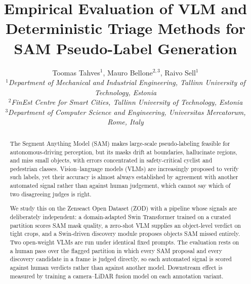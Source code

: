 \documentclass[conference]{IEEEtran}
\title{Empirical Evaluation of VLM and Deterministic Triage Methods for SAM Pseudo-Label Generation}
\author{\small Toomas Tahves$^{1}$, Mauro Bellone$^{2,3}$, Raivo Sell$^{1}$ \\
$^{1}$\textit{Department of Mechanical and Industrial Engineering, Tallinn University of Technology, Estonia} \\
$^{2}$\textit{FinEst Centre for Smart Cities, Tallinn University of Technology, Estonia} \\
$^{3}$\textit{Department of Computer Science and Engineering, Universitas Mercatorum, Rome, Italy} \\
}
\begin{document}
\maketitle

\begin{abstract}
The Segment Anything Model (SAM) makes large-scale pseudo-labeling feasible for autonomous-driving perception, but its masks drift at boundaries, hallucinate regions, and miss small objects, with errors concentrated in safety-critical cyclist and pedestrian classes.
Vision--language models (VLMs) are increasingly proposed to verify such labels, yet their accuracy is almost always established by agreement with another automated signal rather than against human judgement, which cannot say which of two disagreeing judges is right.

We study this on the Zenseact Open Dataset (ZOD) with a pipeline whose signals are deliberately independent: a domain-adapted Swin Transformer trained on a curated partition scores SAM mask quality, a zero-shot VLM supplies an object-level verdict on tight crops, and a Swin-driven discovery module proposes objects SAM missed entirely.
Two open-weight VLMs are run under identical fixed prompts.
The evaluation rests on a human pass over the flagged partition in which every SAM proposal and every discovery candidate in a frame is judged directly, so each automated signal is scored against human verdicts rather than against another model.
Downstream effect is measured by training a camera--LiDAR fusion model on each annotation variant.


\end{abstract}
\end{document}
